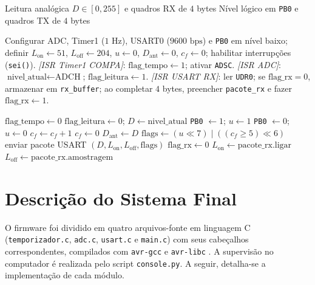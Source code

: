 \documentclass[conference]{IEEEtran}
\begin{document}
\begin{algorithm}[htbp]
	\caption{Monitoramento e controle orientado a interrupções}
	\label{alg:controle}
	\begin{algorithmic}[1]
		\Require Leitura analógica $D \in [0,255]$ e quadros RX de $4$ bytes
		\Ensure Nível lógico em \texttt{PB0} e quadros TX de $4$ bytes

		\State Configurar ADC, Timer1 ($1\text{ Hz}$), USART0 ($9600\text{ bps}$) e \texttt{PB0} em nível baixo; definir $L_{\text{on}} \gets 51$, $L_{\text{off}} \gets 204$, $u \gets 0$, $D_{\text{ant}} \gets 0$, $c_f \gets 0$; habilitar interrupções (\texttt{sei()}).
		\State \textit{[ISR Timer1 COMPA]}: $\text{flag\_tempo} \gets 1$; ativar \texttt{ADSC}.
		\State \textit{[ISR ADC]}: $\text{nivel\_atual} \gets \text{ADCH}$; $\text{flag\_leitura} \gets 1$.
		\State \textit{[ISR USART RX]}: ler \texttt{UDR0}; se $\text{flag\_rx} = 0$, armazenar em \texttt{rx\_buffer}; ao completar $4$ bytes, preencher \texttt{pacote\_rx} e fazer $\text{flag\_rx} \gets 1$.

		\State $\text{flag\_tempo} \gets 0$
		\EndIf
		\State $\text{flag\_leitura} \gets 0$; $D \gets \text{nivel\_atual}$
		\State \texttt{PB0} $\gets 1$; $u \gets 1$
		\State \texttt{PB0} $\gets 0$; $u \gets 0$
		\EndIf
		\State $c_f \gets c_f + 1$
		\Else
		\State $c_f \gets 0$
		\EndIf
		\State $D_{\text{ant}} \gets D$
		\State $\text{flags} \gets (u \ll 7) \mid ((c_f \ge 5) \ll 6)$
		\State enviar pacote USART $(D, L_{\text{on}}, L_{\text{off}}, \text{flags})$
		\EndIf
		\State $\text{flag\_rx} \gets 0$
		\State $L_{\text{on}} \gets \text{pacote\_rx.ligar}$
		\State $L_{\text{off}} \gets \text{pacote\_rx.amostragem}$
		\EndIf
		\EndWhile
	\end{algorithmic}
\end{algorithm}

\section{Descrição do Sistema Final}
O firmware foi dividido em quatro arquivos-fonte em linguagem C (\texttt{temporizador.c}, \texttt{adc.c}, \texttt{usart.c} e \texttt{main.c}) com seus cabeçalhos correspondentes, compilados com \texttt{avr-gcc} e \texttt{avr-libc} \cite{avr_libc}. A supervisão no computador é realizada pelo script \texttt{console.py}. A seguir, detalha-se a implementação de cada módulo.
\end{document}
